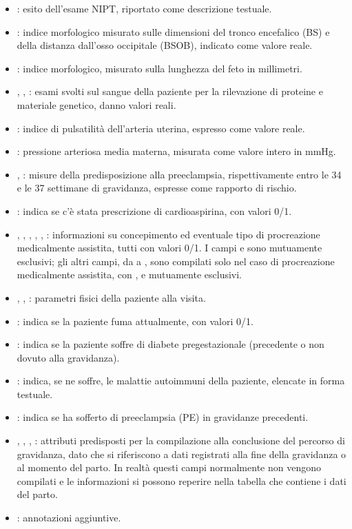 \begin{itemize}
\item {}: esito dell'esame NIPT, riportato come descrizione testuale.
\item {}: indice morfologico misurato sulle dimensioni del tronco encefalico (BS) e della distanza dall'osso occipitale (BSOB), indicato come valore reale.
\item {}: indice morfologico, misurato sulla lunghezza del feto in millimetri.
\item {}, , : esami svolti sul sangue della paziente per la rilevazione di proteine e materiale genetico, danno valori reali.
\item {}: indice di pulsatilità dell'arteria uterina, espresso come valore reale.
\item {}: pressione arteriosa media materna, misurata come valore intero in mmHg.
\item {}, : misure della predisposizione alla preeclampsia, rispettivamente entro le 34 e le 37 settimane di gravidanza, espresse come rapporto di rischio.
\item {}: indica se c'è stata prescrizione di cardioaspirina, con valori 0/1.
\item {}, , , , , : informazioni su concepimento ed eventuale tipo di procreazione medicalmente assistita, tutti con valori 0/1.
I campi  e  sono mutuamente esclusivi; gli altri campi, da  a , sono compilati solo nel caso di procreazione medicalmente assistita, con ,  e  mutuamente esclusivi.
\item {}, , : parametri fisici della paziente alla visita.
\item {}: indica se la paziente fuma attualmente, con valori 0/1.
\item {}: indica se la paziente soffre di diabete pregestazionale (precedente o non dovuto alla gravidanza).
\item {}: indica, se ne soffre, le malattie autoimmuni della paziente, elencate in forma testuale.
\item {}: indica se ha sofferto di preeclampsia (PE) in gravidanze precedenti.
\item {}, , , : attributi predisposti per la compilazione alla conclusione del percorso di gravidanza, dato che si riferiscono a dati registrati alla fine della gravidanza o al momento del parto. In realtà questi campi normalmente non vengono compilati e le informazioni si possono reperire nella tabella che contiene i dati del parto.
\item {}: annotazioni aggiuntive.
\end{itemize}

